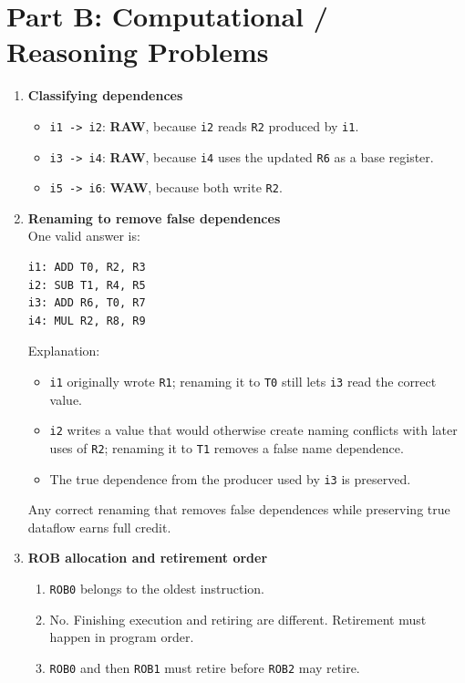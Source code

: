 \documentclass[11pt]{article}
\begin{document}
\section*{Part B: Computational / Reasoning Problems}
\begin{enumerate}[label=\textbf{B\arabic*.}]
  \item \textbf{Classifying dependences}
  \begin{itemize}[leftmargin=1.5em]
    \item \texttt{i1 -> i2}: \textbf{RAW}, because \texttt{i2} reads \texttt{R2} produced by \texttt{i1}.
    \item \texttt{i3 -> i4}: \textbf{RAW}, because \texttt{i4} uses the updated \texttt{R6} as a base register.
    \item \texttt{i5 -> i6}: \textbf{WAW}, because both write \texttt{R2}.
  \end{itemize}

  \item \textbf{Renaming to remove false dependences}
  \\[0.5ex]
  One valid answer is:
\begin{verbatim}
i1: ADD T0, R2, R3
i2: SUB T1, R4, R5
i3: ADD R6, T0, R7
i4: MUL R2, R8, R9
\end{verbatim}
  Explanation:
  \begin{itemize}[leftmargin=1.5em]
    \item \texttt{i1} originally wrote \texttt{R1}; renaming it to \texttt{T0} still lets \texttt{i3} read the correct value.
    \item \texttt{i2} writes a value that would otherwise create naming conflicts with later uses of \texttt{R2}; renaming it to \texttt{T1} removes a false name dependence.
    \item The true dependence from the producer used by \texttt{i3} is preserved.
  \end{itemize}
  Any correct renaming that removes false dependences while preserving true dataflow earns full credit.

  \item \textbf{ROB allocation and retirement order}
  \begin{enumerate}[label=(\alph*)]
    \item \texttt{ROB0} belongs to the oldest instruction.
    \item No. Finishing execution and retiring are different. Retirement must happen in program order.
    \item \texttt{ROB0} and then \texttt{ROB1} must retire before \texttt{ROB2} may retire.
  \end{enumerate}


\end{enumerate}
\end{document}
